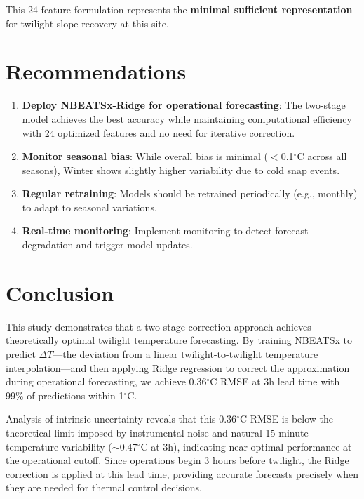\documentclass[11pt]{article}
\begin{document}
This 24-feature formulation represents the \textbf{minimal sufficient representation} for twilight slope recovery at this site.

\section{Recommendations}

\begin{enumerate}
    \item \textbf{Deploy NBEATSx-Ridge for operational forecasting}: The two-stage model achieves the best accuracy while maintaining computational efficiency with 24 optimized features and no need for iterative correction.

    \item \textbf{Monitor seasonal bias}: While overall bias is minimal ($<$0.1$^\circ$C across all seasons), Winter shows slightly higher variability due to cold snap events.

    \item \textbf{Regular retraining}: Models should be retrained periodically (e.g., monthly) to adapt to seasonal variations.

    \item \textbf{Real-time monitoring}: Implement monitoring to detect forecast degradation and trigger model updates.
\end{enumerate}

\section{Conclusion}

This study demonstrates that a two-stage correction approach achieves theoretically optimal twilight temperature forecasting. By training NBEATSx to predict $\Delta T$---the deviation from a linear twilight-to-twilight temperature interpolation---and then applying Ridge regression to correct the approximation during operational forecasting, we achieve 0.36$^\circ$C RMSE at 3h lead time with 99\% of predictions within 1$^\circ$C.

Analysis of intrinsic uncertainty reveals that this 0.36$^\circ$C RMSE is below the theoretical limit imposed by instrumental noise and natural 15-minute temperature variability ($\sim$0.47$^\circ$C at 3h), indicating near-optimal performance at the operational cutoff. Since operations begin 3 hours before twilight, the Ridge correction is applied at this lead time, providing accurate forecasts precisely when they are needed for thermal control decisions.
\end{document}
